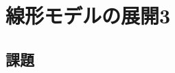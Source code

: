 \documentclass{ltjsbook}
\begin{document}
 
\chapter{線形モデルの展開3}
\label{chapter27} 


\section{課題}
\end{document}
